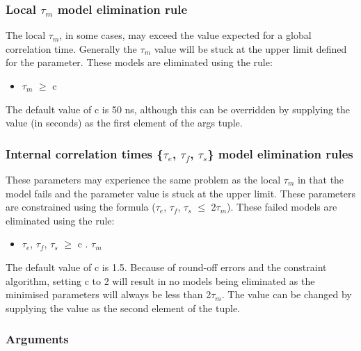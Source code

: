 \subsubsection{Local $\tau_m$ model elimination rule}

The local $\tau_m$, in some cases, may exceed the value expected for a global correlation time. Generally the $\tau_m$ value will be stuck at the upper limit defined for the parameter.  These models are eliminated using the rule:


\begin{itemize}
\item[] $\tau_m$ $\ge$ c 
\end{itemize}


The default value of c is 50 ns, although this can be overridden by supplying the value (in seconds) as the first element of the args tuple.



\subsubsection{Internal correlation times \{$\tau_e$, $\tau_f$, $\tau_s$\} model elimination rules}

These parameters may experience the same problem as the local $\tau_m$ in that the model fails and the parameter value is stuck at the upper limit.  These parameters are constrained using the formula ($\tau_e$, $\tau_f$, $\tau_s$ $\le$ 2$\tau_m$).  These failed models are eliminated using the rule:


\begin{itemize}
\item[] $\tau_e$, $\tau_f$, $\tau_s$ $\ge$ c . $\tau_m$ 
\end{itemize}


The default value of c is 1.5.  Because of round-off errors and the constraint algorithm, setting c to 2 will result in no models being eliminated as the minimised parameters will always be less than 2$\tau_m$.  The value can be changed by supplying the value as the second element of the tuple.



\subsubsection{Arguments}

